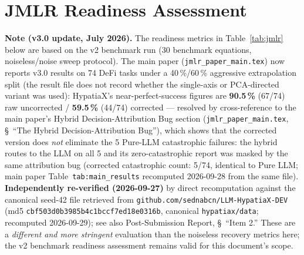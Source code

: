 \documentclass[twoside,11pt]{article}
\begin{document}
\section{JMLR Readiness Assessment}
\label{sec:jmlr}

\noindent\textbf{Note (v3.0 update, July 2026).}
The readiness metrics in Table~\ref{tab:jmlr} below are based on the v2
benchmark run (30 benchmark equations, noiseless/noise sweep protocol).
The main paper (\texttt{jmlr\_paper\_main.tex}) now reports v3.0
results on 74 DeFi tasks under a 40\,\%/60\,\% aggressive extrapolation
split (the result file does not record whether the single-axis or PCA-directed variant was used): HypatiaX's near-perfect-success figures are \textbf{90.5\,\%} (67/74) raw
uncorrected / \textbf{59.5\,\%} (44/74) corrected --- resolved by
cross-reference to the main paper's Hybrid Decision-Attribution Bug
section (\texttt{jmlr\_paper\_main.tex}, \S~``The Hybrid
Decision-Attribution Bug''), which shows that the corrected version does
\emph{not} eliminate the 5 Pure-LLM catastrophic failures: the hybrid
routes to the LLM on all 5 and its zero-catastrophic report was masked by the
same attribution bug (corrected catastrophic count: 5/74, identical to Pure LLM;
main paper Table~\texttt{tab:main\_results} recomputed 2026-09-28 from the same file). \textbf{Independently
re-verified (2026-09-27)} by direct recomputation against the canonical
seed-42 file retrieved from
\texttt{github.com/sednabcn/LLM-HypatiaX-DEV} (md5
\texttt{cbf503d0b3985b4c1bccf7ed18e0316b}, canonical \texttt{hypatiax/data}; recomputed 2026-09-29); see also Post-Submission
Report, \S~``Item 2.'' These are a \emph{different and more stringent}
evaluation than the noiseless recovery metrics here; the v2 benchmark readiness
assessment remains valid for this document's scope.
\end{document}
